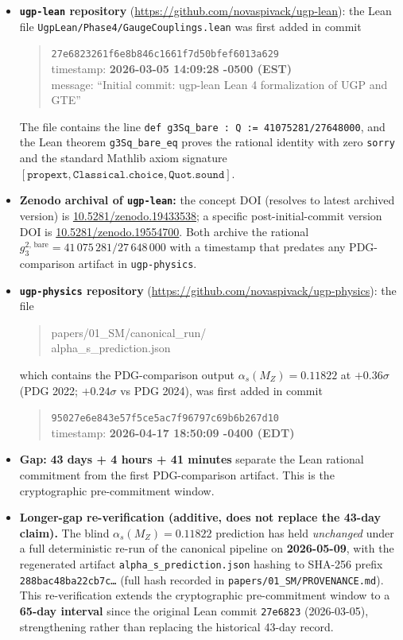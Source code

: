 \documentclass[11pt]{article}
\theoremstyle{remark}
\begin{document}
\begin{appendices}
\begin{itemize}[leftmargin=1.2em,itemsep=0.15em]
\item \textbf{\texttt{ugp-lean} repository} (\url{https://github.com/novaspivack/ugp-lean}): the Lean file \texttt{UgpLean/Phase4/GaugeCouplings.lean} was first added in commit
\begin{quote}
\texttt{27e6823261f6e8b846c1661f}\allowbreak\texttt{7d50bfef6013a629}\\
timestamp: \textbf{2026-03-05 14:09:28 -0500 (EST)}\\
message: ``Initial commit: ugp-lean Lean 4 formalization of UGP and GTE''
\end{quote}
The file contains the line \texttt{def g3Sq\_bare : Q := 41075281/27648000}, and the Lean theorem \texttt{g3Sq\_bare\_eq} proves the rational identity with zero \texttt{sorry} and the standard Mathlib axiom signature $[\texttt{propext}, \texttt{Classical.choice}, \texttt{Quot.sound}]$.
\item \textbf{Zenodo archival of \texttt{ugp-lean}:} the concept DOI (resolves to latest archived version) is \href{https://doi.org/10.5281/zenodo.19433538}{10.5281/zenodo.19433538}; a specific post-initial-commit version DOI is \href{https://doi.org/10.5281/zenodo.19554700}{10.5281/zenodo.19554700}.  Both archive the rational $g_3^{2,\,\mathrm{bare}} = 41\,075\,281/27\,648\,000$ with a timestamp that predates any PDG-comparison artifact in \texttt{ugp-physics}.
\item \textbf{\texttt{ugp-physics} repository} (\url{https://github.com/novaspivack/ugp-physics}): the file
\begin{quote}
\ttfamily\footnotesize\raggedright
\noindent papers/01\_SM/canonical\_run/\\
alpha\_s\_prediction.json
\end{quote}
\noindent
which contains the PDG-comparison output $\alpha_s(M_Z) = 0.11822$ at $+0.36\sigma$ (PDG 2022; $+0.24\sigma$ vs PDG 2024), was first added in commit
\begin{quote}
\texttt{95027e6e843e57f5ce5ac7f9}\allowbreak\texttt{6797c69b6b267d10}\\
timestamp: \textbf{2026-04-17 18:50:09 -0400 (EDT)}
\end{quote}
\item \textbf{Gap:} \textbf{43 days + 4 hours + 41 minutes} separate the Lean rational commitment from the first PDG-comparison artifact.  This is the cryptographic pre-commitment window.
\item \textbf{Longer-gap re-verification (additive, does not replace the 43-day claim).}
The blind $\alpha_s(M_Z) = 0.11822$ prediction has held \emph{unchanged} under a full deterministic re-run of the canonical pipeline on \textbf{2026-05-09}, with the regenerated artifact \texttt{alpha\_s\_prediction.json} hashing to SHA-256 prefix \texttt{288bac48ba22cb7c\ldots} (full hash recorded in \texttt{papers/01\_SM/PROVENANCE.md}).  This re-verification extends the cryptographic pre-commitment window to a \textbf{65-day interval} since the original Lean commit \texttt{27e6823} (2026-03-05), strengthening rather than replacing the historical 43-day record.
\end{itemize}


\end{appendices}
\end{document}
